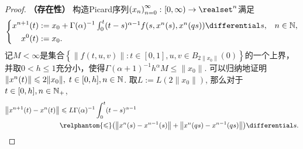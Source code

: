 \begin{proof}
    \textbf{（存在性）} 构造Picard序列$\left(x_n\right)_{n=0}^\infty\colon [0,\infty)\to \realset^n$满足
    \begin{equation*}
        \left\{\begin{aligned}
            x^{n+1}(t)&:=x_0 + \Gamma(\alpha)^{-1} \textstyle\int_0^t (t-s)^{\alpha-1} f(s,x^n(s),x^n(qs))\differential s, & n\in \naturalset,\\
            x^0(t)&:=x_0. & {}
        \end{aligned}\right.
    \end{equation*}
    记$M<\infty$是集合$\left\{\left\|f(t,u,v)\right\|\colon t\in [0,1], u,v\in B_{2\|x_0\|}(0)\right\}$的一个上界，并取$0<h\leqslant 1$充分小，使得$\Gamma(\alpha + 1)^{-1} h^\alpha M \leqslant \|x_0\|$. 可以归纳地证明$\left\|x^{n}(t)\right\|\leqslant 2\|x_0\|,\;t\in [0,h],n\in \mathbb{N}$. 取$L:=L(2\|x_0\|)$, 那么对于$t\in [0,h],n\in \mathbb{N_+}$,
    \begin{equation}
        \begin{aligned}
            \left\| x^{n+1}(t)-x^n(t) \right\|&\leqslant L\Gamma(\alpha)^{-1}\int_0^t (t-s)^{\alpha-1} \\ &\relphantom{\leqslant}\bigl(\left\|x^n(s)-x^{n-1}(s)\right\| + \left\|x^n(qs)-x^{n-1}(qs)\right\|\bigr) \differential s.
        \end{aligned}
    \end{equation}


\end{proof}
